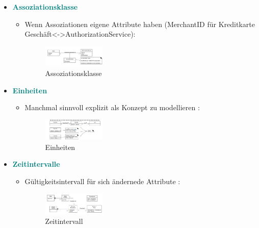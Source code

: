 \documentclass{article}
\begin{document}
\begin{itemize}
\begin{itemize}
\begin{multicols} {2}
\begin{figure}[H]
	\caption{\label{fig:DMRolleKonzept}DMRolleKonzept}
	\end{figure} 
			\end{multicols}
	\end{itemize}
	\item \textcolor {teal} {\textbf{ Assoziationsklasse}}
	\begin{itemize}
		\item Wenn Assoziationen eigene Attribute haben (MerchantID für Kreditkarte Geschäft<->AuthorizationService): \begin{figure}[H]
				\centering
				\includegraphics[width=0.3\textwidth] {Resources/Images/Assoziationsklasse.png}
			\caption{\label{fig:Assoziationsklasse}Assoziationsklasse}
	\end{figure} 
	\end{itemize}
	\item \textcolor {teal} {\textbf{ Einheiten}}
	\begin{itemize}
		\item Manchmal sinnvoll explizit als Konzept zu modellieren : \begin{figure}[H]
				\centering
				\includegraphics[width=0.3\textwidth] {Resources/Images/Einheiten.png}
			\caption{\label{fig:Einheiten}Einheiten}
	\end{figure} 
	\end{itemize}
	\item \textcolor {teal} {\textbf{Zeitintervalle}}
	\begin{itemize}
		\item Gültigkeitsintervall für sich ändernede Attribute : \begin{figure}[H]
				\centering
				\includegraphics[width=0.3\textwidth] {Resources/Images/Zeitintervall.png}
			\caption{\label{fig:Zeitintervall}Zeitintervall}
				\end{figure} 
	\end{itemize}
\end{itemize}
\end{document}
